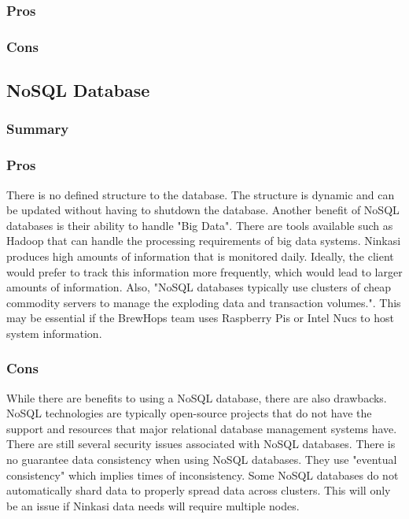 \documentclass[draftclsnofoot,onecolumn,letterpaper,10pt,compsoc]{IEEEtran}
\begin{document}
        \subsubsection{Pros}
    
        \subsubsection{Cons}
        
        
	\subsection{NoSQL Database}
        \subsubsection{Summary}
    
        \subsubsection{Pros}
            There is no defined structure to the database.
            The structure is dynamic and can be updated without having to shutdown the database\cite{MongoDBProsCons}.
            Another benefit of NoSQL databases is their ability to handle "Big Data".
            There are tools available such as Hadoop that can handle the processing requirements of big data systems\cite{NoSQLProsCons}.
            Ninkasi produces high amounts of information that is monitored daily.
            Ideally, the client would prefer to track this information more frequently, which would lead to larger amounts of information.
            Also, "NoSQL databases typically use clusters of cheap commodity servers to manage the exploding data and transaction volumes."\cite{NoSQLProsCons}.
            This may be essential if the BrewHops team uses Raspberry Pis or Intel Nucs to host system information.
            
    
        \subsubsection{Cons}
            While there are benefits to using a NoSQL database, there are also drawbacks.
            NoSQL technologies are typically open-source projects that do not have the support and resources that major relational database management systems have\cite{NoSQLProsCons}.
            There are still several security issues associated with NoSQL databases\cite{NoSQLSecurityIssues}.
            There is no guarantee data consistency when using NoSQL databases\cite{ChannelFutures}.
            They use "eventual consistency" which implies times of inconsistency.
            Some NoSQL databases do not automatically shard data to properly spread data across clusters\cite{ChannelFutures}.
            This will only be an issue if Ninkasi data needs will require multiple nodes.
        
\end{document}
